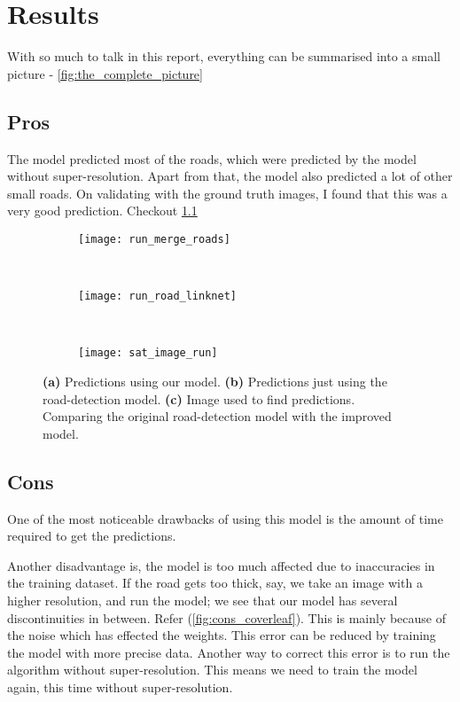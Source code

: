 \chapter{Results}\label{chapt:results}

With so much to talk in this report, everything can be summarised into a small picture - \cref{fig:the_complete_picture}

\section{Pros}
The model predicted most of the roads, which were predicted by the model without super-resolution. Apart from that, the model also predicted a lot of other small roads. On validating with the ground truth images, I found that this was a very good prediction. Checkout \cref{fig:run_merge_road_maps}

\begin{figure}[h!]
  \centering
  \begin{subfigure}{0.55\textwidth}
    \texttt{[image: run\_merge\_roads]}
    \caption{}
  \end{subfigure}~
  \begin{subfigure}{0.21\textwidth}
    \texttt{[image: run\_road\_linknet]}
    \caption{}
  \end{subfigure}~
  \begin{subfigure}{0.21\textwidth}
    \texttt{[image: sat\_image\_run]}
    \caption{}
  \end{subfigure}
  \caption[Predictions]{\textbf{(a)} Predictions using our model. \textbf{(b)} Predictions just using the road-detection model. \textbf{(c)} Image used to find predictions. Comparing the original road-detection model with the improved model.}
  \label{fig:run_merge_road_maps}
\end{figure}


\section{Cons}
One of the most noticeable drawbacks of using this model is the amount of time required to get the predictions. 

Another disadvantage is, the model is too much affected due to inaccuracies in the training dataset. If the road gets too thick, say, we take an image with a higher resolution, and run the model; we see that our model has several discontinuities in between. Refer (\cref{fig:cons_coverleaf}). This is mainly because of the noise which has effected the weights. This error can be reduced by training the model with more precise data. Another way to correct this error is to run the algorithm without super-resolution. This means we need to train the model again, this time without super-resolution.

